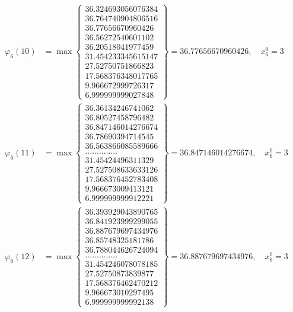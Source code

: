 \documentclass{article}
\begin{document}
\begin{align*}
  
  
  
\varphi_{6}(10) &= \max \left\{ \begin{array}{c}
36.324693056076384 \\
 36.764740904806516 \\
 36.77656670960426 \\
 36.56272540601102 \\
 36.20518041977459 \\
 31.454233345615147 \\
 27.52750751866823 \\
 17.568376348017765 \\
 9.966672999726317 \\
 6.999999999027848
\end{array} \right\} = 36.77656670960426, \quad x_{6}^0 = 3\\
  
  
  
  
\varphi_{6}(11) &= \max \left\{ \begin{array}{c}
36.36134246741062 \\
 36.80527458796482 \\
 36.847146014276674 \\
 36.78690394714545 \\
 36.563866085589666 \\
 .............. \\
 31.45424496311329 \\
 27.527508633633126 \\
 17.568376452783408 \\
 9.966673009413121 \\
 6.999999999912221
\end{array} \right\} = 36.847146014276674, \quad x_{6}^0 = 3\\
  
  
  
  
\varphi_{6}(12) &= \max \left\{ \begin{array}{c}
36.393929043890765 \\
 36.841923999299055 \\
 36.887679697434976 \\
 36.85748325181786 \\
 36.788044626724094 \\
 .............. \\
 31.454246078078185 \\
 27.52750873839877 \\
 17.568376462470212 \\
 9.966673010297495 \\
 6.999999999992138
\end{array} \right\} = 36.887679697434976, \quad x_{6}^0 = 3\\
  

\end{align*}
\end{document}
